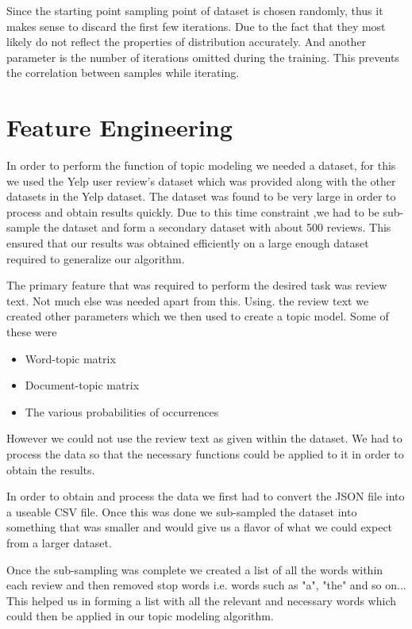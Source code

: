 \documentclass{article}
\begin{document}
Since the starting point sampling point of dataset is chosen randomly, thus it makes sense to discard the first few iterations. Due to the fact that they most likely do not reflect the properties of distribution accurately. And another parameter is  the number of iterations omitted during the training. This prevents the correlation between samples while iterating.


\section{Feature Engineering} 
	\label{engineer} 

	In order to perform the function of topic modeling we needed a dataset, for this we used the Yelp user review's dataset which was provided along with the other datasets in the Yelp dataset. The dataset was found to be very large in order to process and obtain results quickly. Due to this time constraint ,we had to be sub-sample the dataset and form a secondary dataset with about 500 reviews. This ensured that our results was obtained efficiently on a large enough dataset required to generalize our algorithm.
	
	The primary feature that was required to perform the desired task was review text. Not much else was needed apart from this. Using. the review text we created other parameters which we then used to create a topic model. Some of these were 
	
	\begin{itemize}
		\item{Word-topic matrix}
		\item{Document-topic matrix}
		\item{The various probabilities of occurrences}
	\end{itemize} 

	However we could not use the review text as given within the dataset. We had to process the data so that the necessary functions could be applied to it in order to obtain the results. 
	
	In order to obtain and process the data we first had to convert the JSON file into a useable CSV file. Once this was done we sub-sampled the dataset into something that was smaller and would give us a flavor of what we could expect from a larger dataset. 
	
	Once the sub-sampling was complete we created a list of all the words within each review and then removed stop words i.e. words such as "a", "the" and so on... This helped us in forming a list with all the relevant and necessary words which could then be applied in our topic modeling algorithm. 
	
\end{document}
